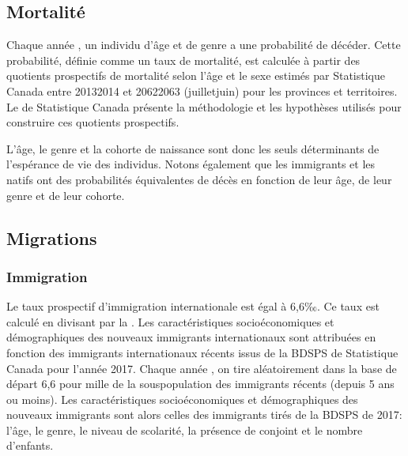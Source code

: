 \documentclass[letterpaper,10pt,french]{sphinxmanual}
\begin{document}
\subsection{Mortalité}
\label{\detokenize{methodologie:mortalite}}
Chaque année , un individu d’âge  et de genre  a une probabilité  de décéder. Cette probabilité, définie comme un taux de mortalité, est calculée à partir des quotients prospectifs de mortalité selon l’âge et le sexe estimés par Statistique Canada entre 2013\sphinxhyphen{}2014 et 2062\sphinxhyphen{}2063 (juillet\sphinxhyphen{}juin) pour les provinces et territoires. Le  de Statistique Canada présente la méthodologie et les hypothèses utilisés pour construire ces quotients prospectifs.

L’âge, le genre et la cohorte de naissance sont donc les seuls déterminants de l’espérance de vie des individus. Notons également que les immigrants et les natifs ont des probabilités équivalentes de décès en fonction de leur âge, de leur genre et de leur cohorte.


\subsection{Migrations}
\label{\detokenize{methodologie:migrations}}

\subsubsection{Immigration}
\label{\detokenize{methodologie:immigration}}
Le taux prospectif d’immigration internationale est égal à 6,6‰. Ce taux est calculé en divisant  par la . Les caractéristiques socio\sphinxhyphen{}économiques et démographiques des nouveaux immigrants internationaux sont attribuées en fonction des immigrants internationaux récents issus de la BDSPS de Statistique Canada pour l’année 2017. Chaque année , on tire aléatoirement dans la base de départ 6,6 pour mille de la sous\sphinxhyphen{}population des immigrants récents (depuis 5 ans ou moins). Les caractéristiques socio\sphinxhyphen{}économiques et démographiques des nouveaux immigrants sont alors celles des immigrants tirés de la BDSPS de 2017: l’âge, le genre, le niveau de scolarité, la présence de conjoint et le nombre d’enfants.
\end{document}
